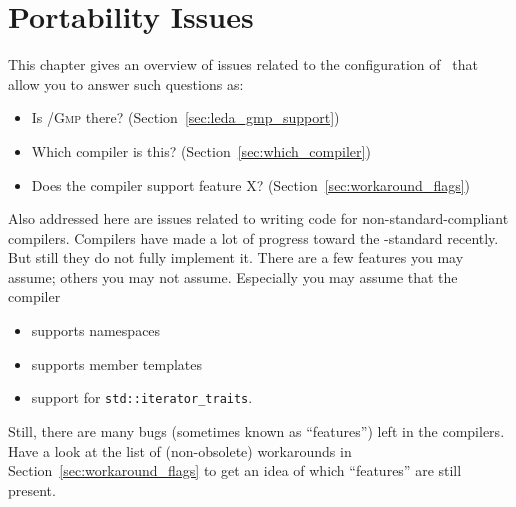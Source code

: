 
\chapter{Portability Issues\label{chap:portability}}

This chapter gives an overview of issues related to the
configuration of \cgal\ that allow you to answer such questions as:
\begin{itemize}
\item Is \leda/\textsc{Gmp} there? (Section~\ref{sec:leda_gmp_support})
\item Which compiler is this? (Section~\ref{sec:which_compiler})
\item Does the compiler support feature X? (Section~\ref{sec:workaround_flags})
\end{itemize}

Also addressed here are issues related to writing code for 
non-standard-compliant compilers.  Compilers have made a lot of progress toward 
the \CC-standard recently.  But still they do not fully implement it. There 
are a few features you may assume; others you may not
assume. Especially you may assume that the compiler
\begin{itemize}
\item supports namespaces
\item supports member templates
\item support for \texttt{std::iterator\_traits}.
\end{itemize}
Still, there are many bugs (sometimes known as ``features'') left in the 
compilers.  Have a look at the list of (non-obsolete) workarounds in 
Section~\ref{sec:workaround_flags} to get an idea of which ``features'' are
still present.  

